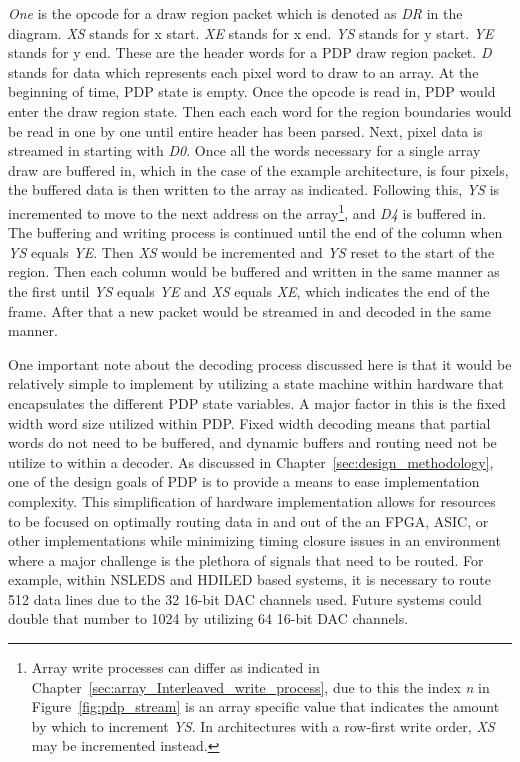     {\it One} is the opcode for a draw region packet which is denoted as {\it DR} in the diagram. {\it XS} stands for x start. {\it XE} stands for x end. {\it YS} stands for y start. {\it YE} stands for y end. These are the header words for a PDP draw region packet. {\it D} stands for data which represents each pixel word to draw to an array. At the beginning of time, PDP state is empty. Once the opcode is read in, PDP would enter the draw region state. Then each each word for the region boundaries would be read in one by one until entire header has been parsed. Next, pixel data is streamed in starting with {\it D0}. Once all the words necessary for a single array draw are buffered in, which in the case of the example architecture, is four pixels, the buffered data is then written to the array as indicated. Following this, {\it YS} is incremented to move to the next address on the array\footnote{Array write processes can differ as indicated in Chapter~\ref{sec:array_Interleaved_write_process}, due to this the index {\it n} in Figure~\ref{fig:pdp_stream} is an array specific value that indicates the amount by which to increment {\it YS}. In architectures with a row-first write order, {\it XS} may be incremented instead.}, and {\it D4} is buffered in. The buffering and writing process is continued until the end of the column when {\it YS} equals {\it YE}. Then {\it XS} would be incremented and {\it YS} reset to the start of the region. Then each column would be buffered and written in the same manner as the first until {\it YS} equals {\it YE} and {\it XS} equals {\it XE}, which indicates the end of the frame. After that a new packet would be streamed in and decoded in the same manner.

    One important note about the decoding process discussed here is that it would be relatively simple to implement by utilizing a state machine within hardware that encapsulates the different PDP state variables. A major factor in this is the fixed width word size utilized within PDP. Fixed width decoding means that partial words do not need to be buffered, and dynamic buffers and routing need not be utilize to within a decoder. As discussed in Chapter~\ref{sec:design_methodology}, one of the design goals of PDP is to provide a means to ease implementation complexity. This simplification of hardware implementation allows for resources to be focused on optimally routing data in and out of the an FPGA, ASIC, or other implementations while minimizing timing closure issues in an environment where a major challenge is the plethora of signals that need to be routed. For example, within NSLEDS and HDILED based systems, it is necessary to route 512 data lines due to the 32 16-bit DAC channels used. Future systems could double that number to 1024 by utilizing 64 16-bit DAC channels.

